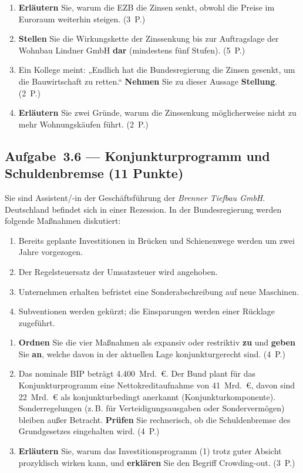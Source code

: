 \begin{enumerate}[label=\alph*)]
  \item \textbf{Erläutern} Sie, warum die EZB die Zinsen senkt, obwohl die Preise im
    Euroraum weiterhin steigen. \hfill (3~P.)
  \item \textbf{Stellen} Sie die Wirkungskette der Zinssenkung bis zur Auftragslage der
    Wohnbau Lindner GmbH \textbf{dar} (mindestens fünf Stufen). \hfill (5~P.)
  \item Ein Kollege meint: „Endlich hat die Bundesregierung die Zinsen gesenkt, um die
    Bauwirtschaft zu retten.“ \textbf{Nehmen} Sie zu dieser Aussage \textbf{Stellung}.
    \hfill (2~P.)
  \item \textbf{Erläutern} Sie zwei Gründe, warum die Zinssenkung möglicherweise nicht zu
    mehr Wohnungskäufen führt. \hfill (2~P.)
\end{enumerate}

\subsection*{Aufgabe~3.6 --- Konjunkturprogramm und Schuldenbremse (11 Punkte)}

Sie sind Assistent/-in der Geschäftsführung der \emph{Brenner Tiefbau GmbH}. Deutschland
befindet sich in einer Rezession. In der Bundesregierung werden folgende Maßnahmen
diskutiert:

\begin{enumerate}[label=(\arabic*)]
  \item Bereits geplante Investitionen in Brücken und Schienenwege werden um zwei Jahre
    vorgezogen.
  \item Der Regelsteuersatz der Umsatzsteuer wird angehoben.
  \item Unternehmen erhalten befristet eine Sonderabschreibung auf neue Maschinen.
  \item Subventionen werden gekürzt; die Einsparungen werden einer Rücklage zugeführt.
\end{enumerate}

\begin{enumerate}[label=\alph*)]
  \item \textbf{Ordnen} Sie die vier Maßnahmen als expansiv oder restriktiv \textbf{zu}
    und \textbf{geben} Sie \textbf{an}, welche davon in der aktuellen Lage
    konjunkturgerecht sind. \hfill (4~P.)
  \item Das nominale BIP beträgt 4.400~Mrd.~€. Der Bund plant für das Konjunkturprogramm
    eine Nettokreditaufnahme von 41~Mrd.~€, davon sind 22~Mrd.~€ als konjunkturbedingt
    anerkannt (Konjunkturkomponente). Sonderregelungen (z.\,B. für Verteidigungsausgaben
    oder Sondervermögen) bleiben außer Betracht. \textbf{Prüfen} Sie rechnerisch, ob die
    Schuldenbremse des Grundgesetzes eingehalten wird. \hfill (4~P.)
  \item \textbf{Erläutern} Sie, warum das Investitionsprogramm (1) trotz guter Absicht
    prozyklisch wirken kann, und \textbf{erklären} Sie den Begriff Crowding-out.
    \hfill (3~P.)
\end{enumerate}


